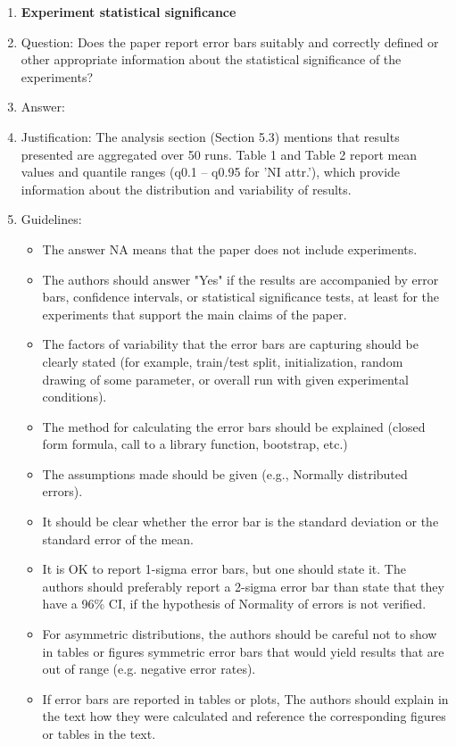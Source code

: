 \documentclass{article}
\theoremstyle{plain}
\theoremstyle{definition}
\theoremstyle{remark}
\begin{document}
\begin{enumerate}
\item {\bf Experiment statistical significance}
    \item[] Question: Does the paper report error bars suitably and correctly defined or other appropriate information about the statistical significance of the experiments?
    \item[] Answer: \answerYes{} %
    \item[] Justification:  The analysis section (Section 5.3) mentions that results presented are aggregated over 50 runs. Table 1 and Table 2 report mean values and quantile ranges (q0.1 -- q0.95 for 'NI attr.'), which provide information about the distribution and variability of results.
    \item[] Guidelines:
    \begin{itemize}
        \item The answer NA means that the paper does not include experiments.
        \item The authors should answer "Yes" if the results are accompanied by error bars, confidence intervals, or statistical significance tests, at least for the experiments that support the main claims of the paper.
        \item The factors of variability that the error bars are capturing should be clearly stated (for example, train/test split, initialization, random drawing of some parameter, or overall run with given experimental conditions).
        \item The method for calculating the error bars should be explained (closed form formula, call to a library function, bootstrap, etc.)
        \item The assumptions made should be given (e.g., Normally distributed errors).
        \item It should be clear whether the error bar is the standard deviation or the standard error of the mean.
        \item It is OK to report 1-sigma error bars, but one should state it. The authors should preferably report a 2-sigma error bar than state that they have a 96\% CI, if the hypothesis of Normality of errors is not verified.
        \item For asymmetric distributions, the authors should be careful not to show in tables or figures symmetric error bars that would yield results that are out of range (e.g. negative error rates).
        \item If error bars are reported in tables or plots, The authors should explain in the text how they were calculated and reference the corresponding figures or tables in the text.
    \end{itemize}


\end{enumerate}
\end{document}
